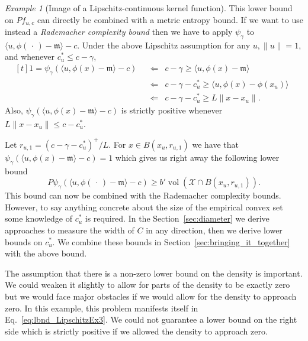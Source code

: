 \documentclass[AHL,Unicode,longabstracts,published]{cedram}
\theoremstyle{remark}
\newtheorem{examl}{Example}
\DeclareMathOperator{\vol}{vol}
\newcommand{\X}{\mathcal{X}}
\newcommand{\mean}{\mathfrak{m}}
\begin{document}
\begin{examl}[{Image of a Lipschitz-continuous kernel function}]
This lower bound on $P f_{u,c}$ can directly be combined with a metric entropy bound. If we want to use instead a \emph{Rademacher complexity bound} then we have to apply $\psi_\gamma$ to $\langle u, \phi(\,\cdot\,) - \mean\rangle -c$. Under the above Lipschitz assumption for any $u, \|u\|=1$, and whenever $c_u^* \leq c - \gamma$,
\begin{equation}\label{eq:psi_to_inner}
\begin{aligned}[t]
1 = \psi_\gamma(\langle u, \phi(x) - \mean \rangle -c)
\enspace &\Longleftarrow \enspace c-\gamma \geq \langle u, \phi(x) - \mean \rangle  \\
&\Longleftarrow \enspace c - \gamma - c_u^* \geq \langle u, \phi(x) - \phi(x_u) \rangle
\enspace\\\
&\Longleftarrow \enspace c - \gamma - c_u^* \geq L \|x - x_u\|.
\end{aligned}
\end{equation}
Also, $\psi_\gamma(\langle u, \phi(x) - \mean \rangle -c)$ is strictly positive whenever $L \|x - x_u\| \leq c - c_u^*$.


Let $r_{u,1} = (c - \gamma - c_u^*)^+/L$. For $x \in B(x_u,r_{u,1})$ we have that $\psi_\gamma(\langle u, \phi(x) - \mean \rangle -c) =1$ which gives us right away the following lower bound
\begin{equation}\label{eq:lbnd_LipschitzEx3}
P\psi_\gamma(\langle u, \phi(\,\cdot\,) - \mean \rangle - c) \geq b' \vol(\X \cap B(x_u,r_{u,1})).
\end{equation}
This bound can now be combined with the Rademacher complexity bounds. However, to say anything concrete about the size of the empirical convex set some knowledge of $c_u^*$ is required. In the Section~\ref{sec:diameter} we derive approaches to measure the width of $C$ in any direction, then we derive lower bounds on $c_u^*$. We combine these bounds in Section~\ref{sec:bringing_it_together} with the above bound.

The assumption that there is a non-zero lower bound on the density is important. We could weaken it slightly to allow for parts of the density to be exactly zero but we would face major obstacles if we would allow for the density to approach zero. In this example, this problem manifests itself in Eq.~\eqref{eq:lbnd_LipschitzEx3}. We could not guarantee a lower bound on the right side which is strictly positive if we allowed the density to approach zero.
\end{examl}
\end{document}
